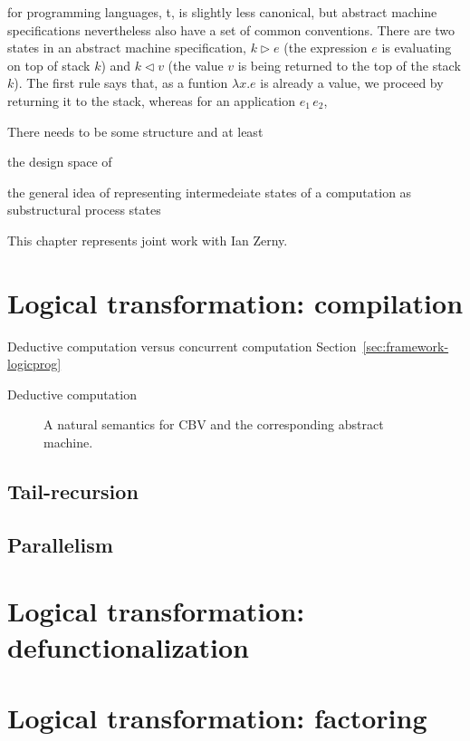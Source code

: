 for programming languages, t, is slightly less canonical, but abstract machine
specifications nevertheless also have a set of common
conventions. There are two states in an abstract machine
specification, $k \rhd e$ (the expression $e$ is evaluating on top of
stack $k$) and $k \lhd v$ (the value $v$ is being returned to the top
of the stack $k$). The first rule says that, as a funtion $\lambda x.e$
is already a value, we proceed by returning it to the stack, whereas
for an application $e_1\,e_2$, 


There needs to be some structure and
at least


the design space
of 

 the general idea
of representing intermedeiate states of a computation as 
substructural process states 

This chapter represents joint work with Ian Zerny.

\section{Logical transformation: compilation}

Deductive computation versus concurrent computation 
Section~\ref{sec:framework-logicprog}

Deductive computation

\begin{figure}


\caption{A natural semantics for CBV and the corresponding abstract machine.}
\end{figure}

\subsection{Tail-recursion}

\subsection{Parallelism}

\section{Logical transformation: defunctionalization}

\section{Logical transformation: factoring}

